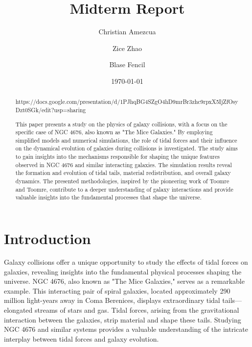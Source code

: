 \documentclass[reprint, amsmath, amssymb, aps]{revtex4-2}
\begin{document}
\title{Midterm Report}

\author{Christian Amezcua}
\author{Zice Zhao}
\author{Blase Fencil}



\date{\today}

\begin{abstract}
https://docs.google.com/presentation/d/1PJhqBG4SZgO4hD9mrBr3zhc9rpxX5IjZfOsyDzt0SGk/edit?usp=sharing

This paper presents a study on the physics of galaxy collisions, with a focus on the specific case of NGC 4676, also known as "The Mice Galaxies." By employing simplified models and numerical simulations, the role of tidal forces and their influence on the dynamical evolution of galaxies during collisions is investigated. The study aims to gain insights into the mechanisms responsible for shaping the unique features observed in NGC 4676 and similar interacting galaxies. The simulation results reveal the formation and evolution of tidal tails, material redistribution, and overall galaxy dynamics. The presented methodologies, inspired by the pioneering work of Toomre and Toomre, contribute to a deeper understanding of galaxy interactions and provide valuable insights into the fundamental processes that shape the universe.
\end{abstract}

\maketitle

\section{Introduction}
\label{sec:intro}

Galaxy collisions offer a unique opportunity to study the effects of tidal forces on galaxies, revealing insights into the fundamental physical processes shaping the universe. NGC 4676, also known as "The Mice Galaxies," serves as a remarkable example. This interacting pair of spiral galaxies, located approximately 290 million light-years away in Coma Berenices, displays extraordinary tidal tails—elongated streams of stars and gas. Tidal forces, arising from the gravitational interaction between the galaxies, strip material and shape these tails. Studying NGC 4676 and similar systems provides a valuable understanding of the intricate interplay between tidal forces and galaxy evolution.
\end{document}
